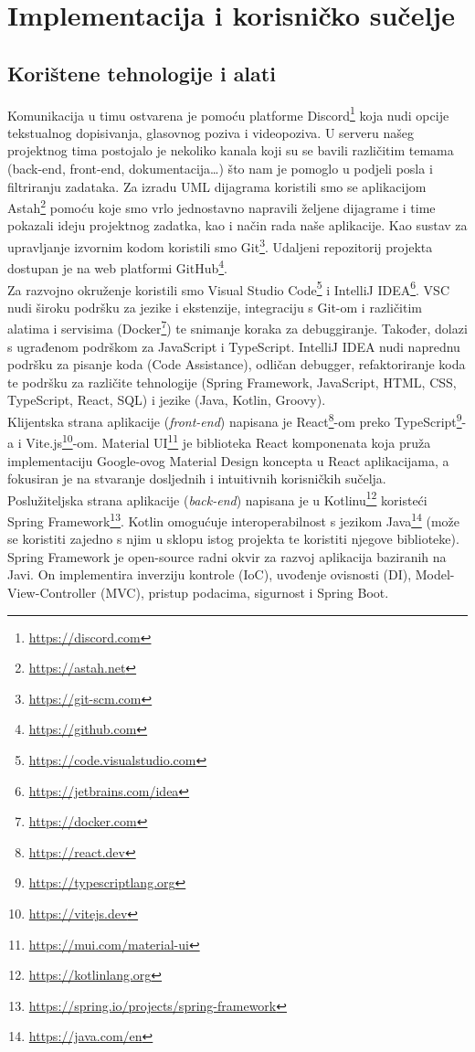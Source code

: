 \chapter{Implementacija i korisničko sučelje}
		
		
		\section{Korištene tehnologije i alati}
		
			Komunikacija u timu ostvarena je pomoću platforme Discord\footnote{\url{https://discord.com}} koja nudi opcije tekstualnog dopisivanja, glasovnog poziva i videopoziva. U serveru našeg projektnog tima postojalo je nekoliko kanala koji su se bavili različitim temama (back-end, front-end, dokumentacija…) što nam je pomoglo u podjeli posla i filtriranju zadataka. Za izradu UML dijagrama koristili smo se aplikacijom Astah\footnote{\url{https://astah.net}} pomoću koje smo vrlo jednostavno napravili željene dijagrame i time pokazali ideju projektnog zadatka, kao i način rada naše aplikacije. Kao sustav za upravljanje izvornim kodom koristili smo Git\footnote{\url{https://git-scm.com}}. Udaljeni repozitorij projekta dostupan je na web platformi GitHub\footnote{\url{https://github.com}}. \\
Za razvojno okruženje koristili smo Visual Studio Code\footnote{\url{https://code.visualstudio.com}} i IntelliJ IDEA\footnote{\url{https://jetbrains.com/idea}}. VSC nudi široku podršku za jezike i ekstenzije, integraciju s Git-om i različitim alatima i servisima (Docker\footnote{\url{https://docker.com}}) te snimanje koraka za debuggiranje. Također, dolazi s ugrađenom podrškom za JavaScript i TypeScript. IntelliJ IDEA nudi naprednu podršku za pisanje koda (Code Assistance), odličan debugger, refaktoriranje koda te podršku za različite tehnologije (Spring Framework, JavaScript, HTML, CSS, TypeScript, React, SQL) i jezike (Java, Kotlin, Groovy). \\
Klijentska strana aplikacije (\textit{front-end}) napisana je React\footnote{\url{https://react.dev}}-om preko TypeScript\footnote{\url{https://typescriptlang.org}}-a i Vite.js\footnote{\url{https://vitejs.dev}}-om. Material UI\footnote{\url{https://mui.com/material-ui}} je biblioteka React komponenata koja pruža implementaciju Google-ovog Material Design koncepta u React aplikacijama, a fokusiran je na stvaranje dosljednih i intuitivnih korisničkih sučelja.\\
Poslužiteljska strana aplikacije (\textit{back-end}) napisana je u Kotlinu\footnote{\url{https://kotlinlang.org}} koristeći Spring Framework\footnote{\url{https://spring.io/projects/spring-framework}}. Kotlin omogućuje interoperabilnost s jezikom Java\footnote{\url{https://java.com/en}} (može se koristiti zajedno s njim u sklopu istog projekta te koristiti njegove biblioteke). Spring Framework je open-source radni okvir za razvoj aplikacija baziranih na Javi. On implementira inverziju kontrole (IoC), uvođenje ovisnosti (DI), Model-View-Controller (MVC), pristup podacima, sigurnost i Spring Boot. \\

